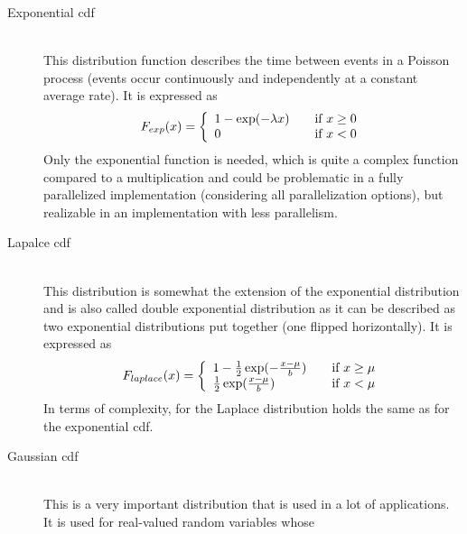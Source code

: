 \documentclass[mscthesis]{usiinfthesis}
\begin{document}
\begin{description}
    \item[Exponential \gls{cdf}] \hfill \\
        This distribution function describes the time between
        events in a Poisson process (events occur continuously and independently
        at a constant average rate). It is expressed as
        \begin{equation}
            \label{eq:cdf_exp}
            F_{exp}(x) = \left\{
                \begin{array}{l l}
                    1 - \exp(-\lambda x)
                        & \quad \text{if $x \geq 0$}\\
                    0
                        & \quad \text{if $x < 0$}
                \end{array} \right.
        \end{equation}
        Only the exponential function is needed, which is quite a complex
        function compared to a multiplication and could be problematic in a
        fully parallelized implementation (considering all parallelization
        options), but realizable in an implementation with less parallelism.
    \item[Lapalce \gls{cdf}] \hfill \\
        This distribution is somewhat the extension of the
        exponential distribution and is also called double exponential
        distribution as it can be described as two exponential distributions
        put together (one flipped horizontally). It is expressed as
        \begin{equation}
            \label{eq:cdf_laplace}
            F_{laplace}(x) = \left\{
                \begin{array}{l l}
                    1 - \frac{1}{2}\exp(-\frac{x-\mu}{b})
                        & \quad \text{if $x \geq \mu$}\\
                    \frac{1}{2} \exp(\frac{x-\mu}{b})
                        & \quad \text{if $x < \mu$}
                \end{array} \right.
        \end{equation}
        In terms of complexity, for the Laplace distribution holds the same as
        for the exponential \gls{cdf}.
    \item[Gaussian \gls{cdf}] \hfill \\
        This is a very important distribution that is used in a lot of
        applications. It is used for real-valued random variables whose

\end{description}
\end{document}
